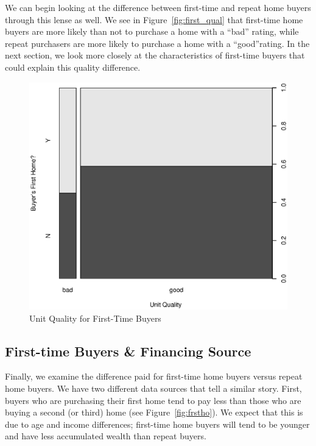 \documentclass[11pt, fleqn]{article}
\begin{document}
We can begin looking at the difference between first-time and repeat home buyers through this lense as well. We see in Figure~\vref{fig:first_qual} that first-time home buyers are more likely than not to purchase a home with a ``bad'' rating, while repeat purchasers are more likely to purchase a home with a ``good''rating. In the next section, we look more closely at the characteristics of first-time buyers that could explain this quality difference.

\begin{figure}[!htb]
  \centering
  \includegraphics[scale=.5]{first_home_vs_home_quality.eps}
  \caption{Unit Quality for First-Time Buyers}
  \label{fig:first_qual}
\end{figure}

\subsection{First-time Buyers \& Financing Source}

Finally, we examine the difference paid for first-time home buyers versus repeat home buyers. We have two different data sources that tell a similar story. First, buyers who are purchasing their first home tend to pay less than those who are buying a second (or third) home (see Figure~\vref{fig:frstho}). We expect that this is due to age and income differences; first-time home buyers will tend to be younger and have less accumulated wealth than repeat buyers. 
\end{document}
